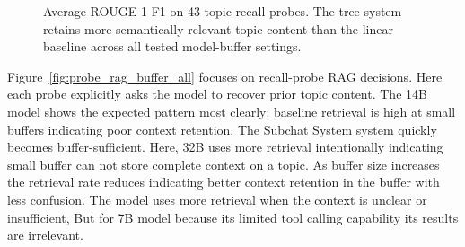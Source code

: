 \documentclass[pdflatex,sn-mathphys-num]{sn-jnl}%
\theoremstyle{thmstyleone}%
\theoremstyle{thmstyletwo}%
\theoremstyle{thmstylethree}%
\begin{document}
\begin{figure}[htbp]
\centering
{}
\caption{Average ROUGE-1 F1 on 43 topic-recall probes. The tree system retains more semantically relevant topic content than the linear baseline across all tested model-buffer settings.}
\label{fig:rouge1_buffer_all}
\end{figure}

Figure~\ref{fig:probe_rag_buffer_all} focuses on recall-probe RAG decisions. Here each probe explicitly asks the model to recover prior topic content. The 14B model shows the expected pattern most clearly: baseline retrieval is high at small buffers indicating poor context retention. The Subchat System system quickly becomes buffer-sufficient. Here, 32B uses more retrieval intentionally indicating small buffer can not store complete context on a topic. As buffer size increases the retrieval rate reduces indicating better context retention in the buffer with less confusion. The model uses more retrieval when the context is unclear or insufficient, But for 7B model because its limited tool calling capability its results are irrelevant.
\end{document}
